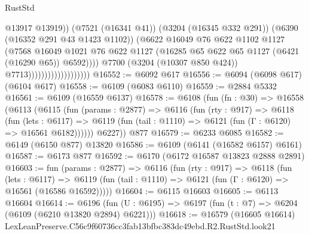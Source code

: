 \begin{lexlean}{RustStd}
\begin{coremodule}
                                                @13917
                                                @13919))
                                            (@7521 (@16341 @41))
                                            (@3204 (@16345 @332 @291))
                                            (@6390 (@16352 @291 @43 @1423 @1102))
                                            (@6622
                                              @16049
                                              @76
                                              @622
                                              @1102
                                              @1127
                                              (@7568
                                                @16049
                                                @1021
                                                @76
                                                @622
                                                @1127
                                                (@16285
                                                  @65
                                                  @622
                                                  @65
                                                  @1127
                                                  (@6421 (@16290 @65))
                                                  @6592))))
                                          @7700
                                          (@3204 (@10307 @850 @424))
                                          @7713)))))))))))))))))))
@16552 := @6092 @617
@16556 := @6094 (@6098 @617) (@6104 @617)
@16558 := @6109 (@6083 @6110)
@16559 := @2884 @5332
@16561 := @6109 (@16559 @6137)
@16578 := @6108
    (fun (fn : @30) =>
    @16558
      (@6113
        (@6115
          (fun (params : @2877) =>
          @6116
            (fun (rty : @917) =>
            @6118
              (fun (lets : @6117) =>
              @6119 (fun (tail : @1110) => @6121 (fun (Γ : @6120) => @16561 @6182))))))
        @6227))
    @877
@16579 := @6233 @6085
@16582 := @6149 (@6150 @877) @13820
@16586 := @6109 (@6141 (@16582 @6157) @6161)
@16587 := @6173 @877
@16592 := @6170 (@6172 @16587 @13823 @2888 @2891)
@16603 := fun (params : @2877) =>
  @6116
    (fun (rty : @917) =>
    @6118
      (fun (lets : @6117) =>
      @6119 (fun (tail : @1110) => @6121 (fun (Γ : @6120) => @16561 (@16586 @16592)))))
@16604 := @6115 @16603
@16605 := @6113 @16604
@16614 := @6196
    (fun (U : @6195) => @6197 (fun (t : @7) => @6204 (@6109 (@6210 @13820 @2894) @6221)))
@16618 := @16579 (@16605 @16614) LexLeanPreserve.C56c9f60736cc3fab13bfbc383dc49ebd.R2.RustStd.look21

\end{coremodule}
\end{lexlean}
